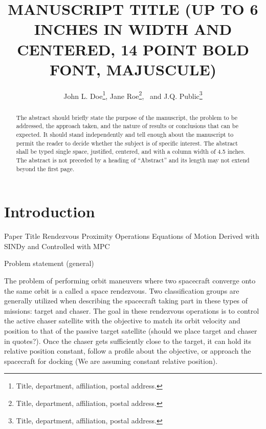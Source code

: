\documentclass[letterpaper, preprint, paper,11pt]{AAS}	%
\begin{document}
\title{MANUSCRIPT TITLE (UP TO 6 INCHES IN WIDTH AND CENTERED, 14 POINT BOLD FONT, MAJUSCULE)}

\author{John L. Doe\thanks{Title, department, affiliation, postal address.},  
Jane Roe\thanks{Title, department, affiliation, postal address.},
\ and J.Q. Public\thanks{Title, department, affiliation, postal address.}
}


\maketitle{} 		


\begin{abstract}
	
The abstract should briefly state the purpose of the manuscript, the problem to be addressed, the approach taken, and the nature of results or conclusions that can be expected. It should stand independently and tell enough about the manuscript to permit the reader to decide whether the subject is of specific interest. The abstract shall be typed single space, justified, centered, and with a column width of 4.5 inches. The abstract is not preceded by a heading of ``Abstract'' and its length may not extend beyond the first page.

\end{abstract}








\section{Introduction}
Paper Title
Rendezvous Proximity Operations Equations of Motion Derived with SINDy and Controlled with MPC

Problem statement (general)

The problem of performing orbit maneuvers where two spacecraft converge onto the same orbit is a called a space rendezvous. Two classification groups are generally utilized when describing the spacecraft taking part in these types of missions: target and chaser. The goal in these rendezvous operations is to control the active chaser satellite with the objective to match its orbit velocity and position to that of the passive target satellite (should we place target and chaser in quotes?). Once the chaser gets sufficiently close to the target, it can hold its relative position constant, follow a profile about the objective, or approach the spacecraft for docking (We are assuming constant relative position).
\end{document}
